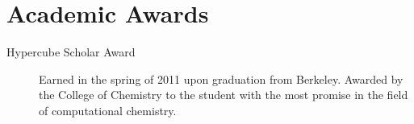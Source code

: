 \section{Academic Awards}

\begin{description}
\item[Hypercube Scholar Award\footnotemark]
Earned in the spring of 2011 upon graduation from Berkeley.  Awarded by the 
College of Chemistry to the student with the most promise in the field of 
computational chemistry.

\end{description}


